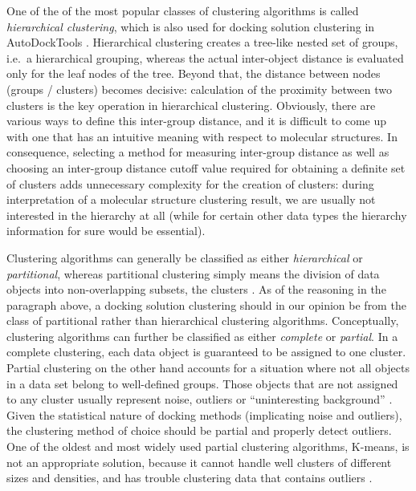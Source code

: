 One of the of the most popular classes of clustering algorithms is called
\textit{hierarchical clustering}, which is also used for docking solution
clustering in AutoDockTools \cite{autodock4_adt_2009}. Hierarchical clustering
creates a tree-like nested set of groups, i.e.\ a hierarchical grouping, whereas
the actual inter-object distance is evaluated only for the leaf nodes of the
tree. Beyond that, the distance between nodes (groups / clusters) becomes
decisive: calculation of the proximity between two clusters is the key operation
in hierarchical clustering. Obviously, there are various ways to define this
inter-group distance, and it is difficult to come up with one that has an
intuitive meaning with respect to molecular structures. In consequence,
selecting a method for measuring inter-group distance as well as choosing an
inter-group distance cutoff value required for obtaining a definite set of
clusters adds unnecessary complexity for the creation of clusters: during
interpretation of a molecular structure clustering result, we are usually not
interested in the hierarchy at all (while for certain other data types the
hierarchy information for sure would be essential).

Clustering algorithms can generally be classified as either
\textit{hierarchical} or \textit{partitional}, whereas partitional clustering
simply means the division of data objects into non-overlapping subsets, the
clusters \cite{tan_data_mining}. As of the reasoning in the paragraph above, a
docking solution clustering should in our opinion be from the class of
partitional rather than hierarchical clustering algorithms. Conceptually,
clustering algorithms can further be classified as either \textit{complete} or
\textit{partial}. In a complete clustering, each data object is guaranteed to be
assigned to one cluster. Partial clustering on the other hand accounts for a
situation where not all objects in a data set belong to well-defined groups.
Those objects that are not assigned to any cluster usually represent noise,
outliers or \enquote{uninteresting background} \cite{tan_data_mining}. Given the
statistical nature of docking methods (implicating noise and outliers), the
clustering method of choice should be partial and properly detect outliers. One
of the oldest and most widely used partial clustering algorithms, K-means, is
not an appropriate solution, because it cannot handle well clusters of
different sizes and densities, and has trouble clustering data that contains
outliers \cite{tan_data_mining}.

